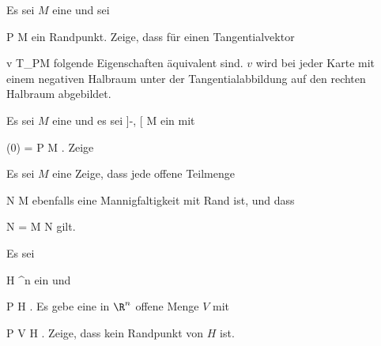 {}
{

Es sei $M$ eine
und sei

\mavergleichskette
{\vergleichskette
{ P
}
{ \in }{ \partial M
}
{  }{
}
{    }{
}
{   }{
}
}
{}{}{}
ein Randpunkt. Zeige, dass für einen Tangentialvektor

\mavergleichskette
{\vergleichskette
{ v
}
{ \in }{ T_PM
}
{  }{
}
{    }{
}
{   }{
}
}
{}{}{}
folgende Eigenschaften äquivalent sind.
 { $v$ wird bei jeder Karte mit einem negativen Halbraum unter der Tangentialabbildung auf den rechten Halbraum abgebildet.
}

}
{} {}

{}
{

Es sei $M$ eine
und es sei
\maabbdisp {\gamma} {{]{-\epsilon}, \epsilon[}} {M
} {}
ein
mit

\mavergleichskettedisp
{\vergleichskette
{ \gamma (0)
}
{ =} { P
}
{ \in} { \partial M
}
{ } {
}
{ } {
}
}
{}{}{.}
Zeige

}
{} {}

{}
{

Es sei $M$ eine
Zeige, dass jede offene Teilmenge

\mavergleichskette
{\vergleichskette
{ N
}
{ \subseteq }{ M
}
{  }{
}
{    }{
}
{   }{
}
}
{}{}{}
ebenfalls eine Mannigfaltigkeit mit
 {} {}
Rand ist, und dass

\mavergleichskettedisp
{\vergleichskette
{ \partial N
}
{ =} { \partial M \cap N
}
{ } {
}
{ } {
}
{ } {
}
}
{}{}{}
gilt.

}
{} {}

{}
{

Es sei

\mavergleichskette
{\vergleichskette
{ H
}
{ \subseteq }{ \R^n
}
{  }{
}
{    }{
}
{   }{
}
}
{}{}{}
ein
und

\mavergleichskette
{\vergleichskette
{ P
}
{ \in }{ H
}
{  }{
}
{    }{
}
{   }{
}
}
{}{}{.}
Es gebe eine in $\R^n$ offene Menge $V$ mit

\mavergleichskette
{\vergleichskette
{ P
}
{ \in }{ V
}
{ \subseteq }{ H
}
{    }{
}
{   }{
}
}
{}{}{.}
Zeige, dass
 kein Randpunkt von $H$ ist.

}
{} {}

